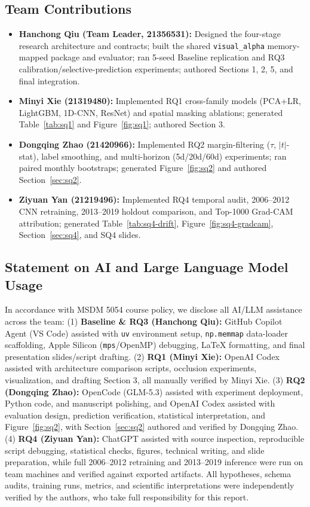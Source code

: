 \documentclass[10pt]{article}
\begin{document}
\subsection*{Team Contributions}
\begin{itemize}[leftmargin=1.4em,itemsep=0.5pt,topsep=1pt]
  \item \textbf{Hanchong Qiu (Team Leader, 21356531):} Designed the four-stage research architecture and contracts; built the shared \texttt{visual\_alpha} memory-mapped package and evaluator; ran 5-seed Baseline replication and RQ3 calibration/selective-prediction experiments; authored Sections 1, 2, 5, and final integration.
  \item \textbf{Minyi Xie (21319480):} Implemented RQ1 cross-family models (PCA+LR, LightGBM, 1D-CNN, ResNet) and spatial masking ablations; generated Table~\ref{tab:sq1} and Figure~\ref{fig:sq1}; authored Section 3.
  \item \textbf{Dongqing Zhao (21420966):} Implemented RQ2 margin-filtering ($\tau$, $|t|$-stat), label smoothing, and multi-horizon (5d/20d/60d) experiments; ran paired monthly bootstraps; generated Figure~\ref{fig:sq2} and authored Section~\ref{sec:sq2}.
  \item \textbf{Ziyuan Yan (21219496):} Implemented RQ4 temporal audit, 2006--2012 CNN retraining, 2013--2019 holdout comparison, and Top-1000 Grad-CAM attribution; generated Table~\ref{tab:sq4-drift}, Figure~\ref{fig:sq4-gradcam}, Section~\ref{sec:sq4}, and SQ4 slides.
\end{itemize}

\subsection*{Statement on AI and Large Language Model Usage}
In accordance with MSDM 5054 course policy, we disclose all AI/LLM assistance across the team: (1) \textbf{Baseline \& RQ3 (Hanchong Qiu):} GitHub Copilot Agent (VS Code) assisted with \texttt{uv} environment setup, \texttt{np.memmap} data-loader scaffolding, Apple Silicon (\texttt{mps}/OpenMP) debugging, \LaTeX{} formatting, and final presentation slides/script drafting. (2) \textbf{RQ1 (Minyi Xie):} OpenAI Codex assisted with architecture comparison scripts, occlusion experiments, visualization, and drafting Section 3, all manually verified by Minyi Xie. (3) \textbf{RQ2 (Dongqing Zhao):} OpenCode (GLM-5.3) assisted with experiment deployment, Python code, and manuscript polishing, and OpenAI Codex assisted with evaluation design, prediction verification, statistical interpretation, and Figure~\ref{fig:sq2}, with Section~\ref{sec:sq2} authored and verified by Dongqing Zhao. (4) \textbf{RQ4 (Ziyuan Yan):} ChatGPT assisted with source inspection, reproducible script debugging, statistical checks, figures, technical writing, and slide preparation, while full 2006--2012 retraining and 2013--2019 inference were run on team machines and verified against exported artifacts. All hypotheses, schema audits, training runs, metrics, and scientific interpretations were independently verified by the authors, who take full responsibility for this report.
\end{document}
